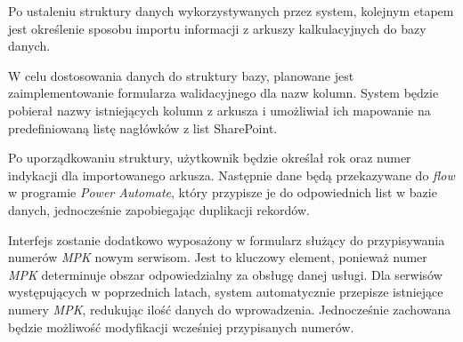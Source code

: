 Po ustaleniu struktury danych wykorzystywanych przez system, kolejnym etapem jest określenie sposobu importu informacji z arkuszy kalkulacyjnych do bazy danych.



W celu dostosowania danych do struktury bazy, planowane jest zaimplementowanie formularza walidacyjnego dla nazw kolumn. System będzie pobierał nazwy istniejących kolumn z arkusza i umożliwiał ich mapowanie na predefiniowaną listę nagłówków z list SharePoint.

Po uporządkowaniu struktury, użytkownik będzie określał rok oraz numer indykacji dla importowanego arkusza. Następnie dane będą przekazywane do \emph{flow} w programie \emph{Power Automate}, który przypisze je do odpowiednich list w bazie danych, jednocześnie zapobiegając duplikacji rekordów.

Interfejs zostanie dodatkowo wyposażony w formularz służący do przypisywania numerów \emph{MPK} nowym serwisom. Jest to kluczowy element, ponieważ numer \emph{MPK} determinuje obszar odpowiedzialny za obsługę danej usługi. Dla serwisów występujących w poprzednich latach, system automatycznie przepisze istniejące numery \emph{MPK}, redukując ilość danych do wprowadzenia. Jednocześnie zachowana będzie możliwość modyfikacji wcześniej przypisanych numerów.

